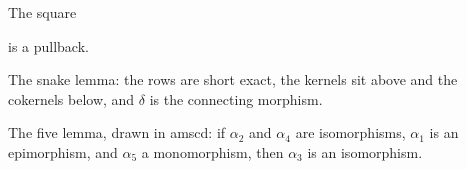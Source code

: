 \documentclass{article}
\begin{document}
The square

is a pullback.

The snake lemma: the rows are short exact, the kernels sit above and the
cokernels below, and $\delta$ is the connecting morphism.


The five lemma, drawn in amscd: if $\alpha_2$ and $\alpha_4$ are isomorphisms,
$\alpha_1$ is an epimorphism, and $\alpha_5$ a monomorphism, then $\alpha_3$ is
an isomorphism.

\end{document}
